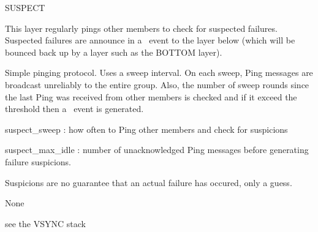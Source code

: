 %
%
%
\begin{Layer}{SUSPECT}

This layer regularly pings other members to check for suspected
failures.  Suspected failures are announce in a \DnSuspect\ event to
the layer below (which will be bounced back up by a layer such as the
BOTTOM layer).

\begin{Protocol}
Simple pinging protocol.  Uses a sweep interval.  On each sweep, Ping
messages are broadcast unreliably to the entire group.  Also, the
number of sweep rounds since the last Ping was received from other
members is checked and if it exceed the  threshold
then a \DnSuspect\ event is generated.  
\end{Protocol}

\begin{Parameters}
\item 
suspect\_sweep : how often to Ping other members and check for suspicions
\item
suspect\_max\_idle : number of unacknowledged Ping messages before generating
failure suspicions.
\end{Parameters}

\begin{Properties}
\item
Suspicions are no guarantee that an actual failure has occured, only a guess.
\end{Properties}

\begin{Notes}
\item None
\end{Notes}

\begin{Sources}
\end{Sources}

\begin{GenEvent}
\genevent{\DnSuspect}
\genevent{\DnCast}
\genevent{\DnTimer}
\end{GenEvent}

\begin{Testing}
\item see the VSYNC stack
\end{Testing}
\end{Layer}
